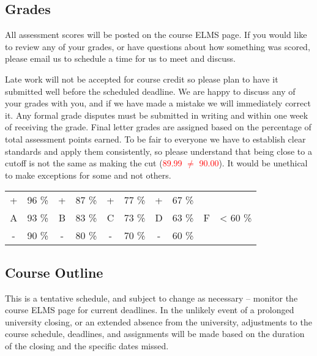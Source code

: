 \documentclass[11pt,usenames,dvipsnames,svgnames,x11names,letterpaper]{article}
\newcommand{\mynote}{\textcolor{DodgerBlue2}{{\faEdit}}\xspace}
\begin{document}
\subsection{Grades}

All assessment scores will be posted on the course ELMS page. If you would like to review any of your grades, or have questions about how something was scored, please email us to schedule a time for us to meet and discuss.

Late work will not be accepted for course credit so please plan to have it submitted well before the scheduled
deadline. We are happy to discuss any of your grades with you, and if we have made a mistake we will immediately correct
it. Any formal grade disputes must be submitted in writing and within one week of receiving the grade. Final letter grades are assigned based on the percentage of total assessment points earned. To be fair to everyone we
have to establish clear standards and apply them consistently, so please understand that being close to a cutoff is
not the same as making the cut (\textcolor{red}{89.99 $\neq$ 90.00}). It would be unethical to make exceptions for some and not others.

\begin{center}
\begin{tabular}{|c|c|c|c|c|c|c|c|c|c|}
 \hline
 \rowcolor{Gray!30}
 \multicolumn{10}{|c|}{Final Grade Cutoffs}
 \\
 \hline
 \rowcolor{Gray!10}
+ & 96 \% & + & 87 \% & + & 77 \% & + & 67 \% & & \\
A & 93 \% & B & 83 \% & C & 73 \% & D & 63 \% & F & < 60 \% \\
\rowcolor{Gray!10}
- & 90 \% & - & 80 \% & - & 70 \% & - & 60 \% &  &  \\
\hline
\end{tabular}
\end{center}


\subsection{Course Outline}
\mynote This is a tentative schedule, and subject to change as necessary – monitor the course ELMS page for current
deadlines. In the unlikely event of a prolonged university closing, or an extended absence from the university,
adjustments to the course schedule, deadlines, and assignments will be made based on the duration of the closing
and the specific dates missed.
\end{document}
